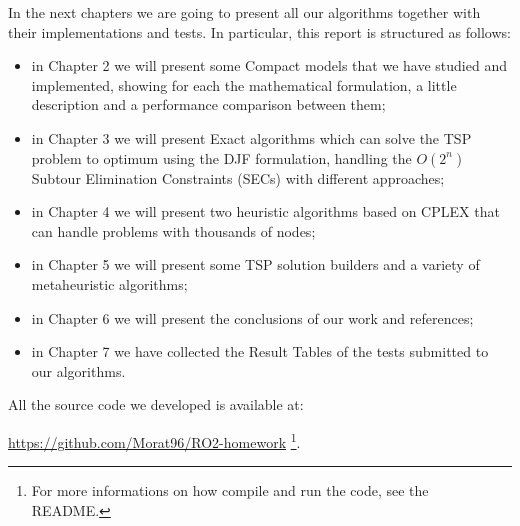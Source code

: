 \noindent 
In the next chapters we are going to present all our algorithms together with their implementations and tests. In particular, this report is structured as follows:

\begin{itemize}
  \item in Chapter 2 we will present some Compact models that we have studied and implemented, showing for each the mathematical formulation, a little description and a performance comparison between them;
  \item in Chapter 3 we will present Exact algorithms which can solve the TSP problem to optimum using the DJF formulation, handling the $O(2^n)$ Subtour Elimination Constraints (SECs) with different approaches;
    \item in Chapter 4 we will present two heuristic algorithms based on CPLEX that can handle problems with thousands of nodes;
    \item in Chapter 5 we will present some TSP solution builders and a variety of metaheuristic algorithms;
     \item in Chapter 6 we will present the conclusions of our work and references;
     \item in Chapter 7 we have collected the Result Tables of the tests submitted to our algorithms.
\end{itemize}

All the source code we developed is available at:
\begin{center}
\url{https://github.com/Morat96/RO2-homework} \footnote{For more informations on how compile and run the code, see the README.}. 

\end{center}

